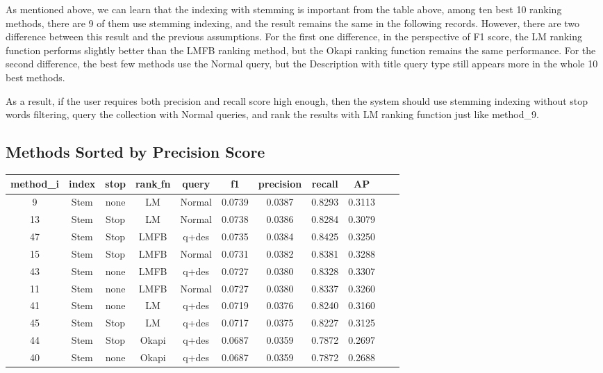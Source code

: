 \documentclass[10pt, a4paper]{article}
\begin{document}
As mentioned above, we can learn that the indexing with stemming is important from the table above, among ten best 10 ranking methods, there are 9 of them use stemming indexing, and the result remains the same in the following records. However, there are two difference between this result and the previous assumptions. For the first one difference, in the perspective of F1 score, the LM ranking function performs slightly better than the LMFB ranking method, but the Okapi ranking function remains the same performance. For the second difference, the best few methods use the Normal query, but the Description with title query type still appears more in the whole 10 best methods.

As a result, if the user requires both precision and recall score high enough, then the system should use stemming indexing without stop words filtering, query the collection with Normal queries, and rank the results with LM ranking function just like method_9.

\subsection{Methods Sorted by Precision Score}
\begin{center}
\begin{tabular}{ |c|c|c|c|c|c|c|c|c|c|c| } 
\hline
method_i  & index & stop & rank$\_$fn & query & f1 & precision & recall & AP \\
\hline
9 & Stem & none & LM & Normal & 0.0739 &  0.0387 & 0.8293 & 0.3113 \\
 13 & Stem & Stop & LM & Normal & 0.0738 &  0.0386 & 0.8284 & 0.3079 \\
 47 & Stem & Stop & LMFB &  q+des & 0.0735 &  0.0384 & 0.8425 & 0.3250 \\
 15 & Stem & Stop & LMFB & Normal & 0.0731 &  0.0382 & 0.8381 & 0.3288 \\
 43 & Stem & none & LMFB &  q+des & 0.0727 &  0.0380 & 0.8328 & 0.3307 \\
 11 & Stem & none & LMFB & Normal & 0.0727 &  0.0380 & 0.8337 & 0.3260 \\
 41 & Stem & none & LM &  q+des & 0.0719 &  0.0376 & 0.8240 & 0.3160 \\
 45 & Stem & Stop & LM &  q+des & 0.0717 &  0.0375 & 0.8227 & 0.3125 \\
 44 & Stem & Stop &  Okapi &  q+des & 0.0687 &  0.0359 & 0.7872 & 0.2697 \\
 40 & Stem & none &  Okapi &  q+des & 0.0687 &  0.0359 & 0.7872 & 0.2688 \\
\hline
\end{tabular}
\end{center}
\end{document}
